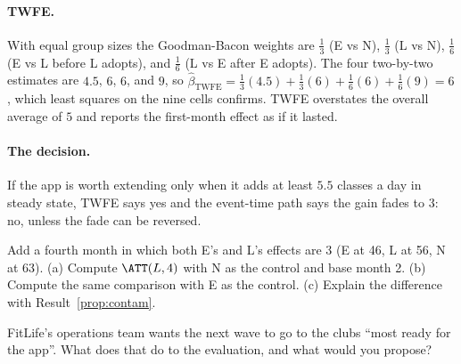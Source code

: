 \documentclass[11pt]{article}
\begin{document}
\paragraph{TWFE.} With equal group sizes the Goodman-Bacon weights are $\tfrac13$ (E vs N), $\tfrac13$ (L vs N), $\tfrac16$ (E vs L before L adopts), and $\tfrac16$ (L vs E after
E adopts). The four two-by-two estimates are $4.5$, $6$, $6$, and $9$, so
$\hat\beta_{\text{TWFE}} = \tfrac13(4.5) + \tfrac13(6) + \tfrac16(6) + \tfrac16(9) = 6$, which least squares on the nine cells confirms. TWFE overstates the overall average of
$5$ and reports the first-month effect as if it lasted.

\paragraph{The decision.} If the app is worth extending only when it adds at least $5.5$ classes a day in steady state, TWFE says yes and the event-time path
says the gain fades to $3$: no, unless the fade can be reversed.

\begin{exercise}[computation]
Add a fourth month in which both E's and L's effects are $3$ (E at 46, L at 56, N at 63). (a) Compute $\ATT(L,4)$ with N as the control and base month 2.
(b) Compute the same comparison with E as the control. (c) Explain the difference with Result~\ref{prop:contam}.
\end{exercise}

\begin{exercise}[judgment]
FitLife's operations team wants the next wave to go to the clubs ``most ready for the app''. What does that do to the evaluation, and what would you
propose?
\end{exercise}

\sectionthree
\end{document}
